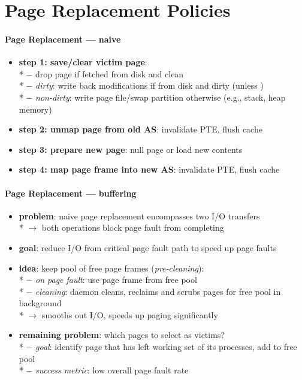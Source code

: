 \section{Page Replacement Policies}

\paragraph{Page Replacement --- naive}
\begin{itemize}
  \item \textbf{step 1: save/clear victim page}: \\*
    $ - $ drop page if fetched from disk and clean \\*
    $ - $ \emph{dirty}: write back modifications if from disk and dirty (unless ) \\*
    $ - $ \emph{non-dirty}: write page file/swap partition otherwise (e.g., stack, heap memory)
  \item \textbf{step 2: unmap page from old AS}: invalidate PTE, flush cache
  \item \textbf{step 3: prepare new page}: null page or load new contents
  \item \textbf{step 4: map page frame into new AS}: invalidate PTE, flush cache
\end{itemize}

\paragraph{Page Replacement --- buffering}
\begin{itemize}
  \item \textbf{problem}: naive page replacement encompasses two I/O transfers \\*
    $ \to $ both operations block page fault from completing
  \item \textbf{goal}: reduce I/O from critical page fault path to speed up page faults
  \item \textbf{idea}: keep pool of free page frames (\emph{pre-cleaning}): \\*
    $ - $ \emph{on page fault}: use page frame from free pool \\*
    $ - $ \emph{cleaning}: daemon cleans, reclaims and scrubs pages for free pool in background \\*
    $ \to $ smooths out I/O, speeds up paging significantly
  \item \textbf{remaining problem}: which pages to select as victims? \\*
    $ - $ \emph{goal}: identify page that has left working set of its processes, add to free pool \\*
    $ - $ \emph{success metric}: low overall page fault rate
\end{itemize}

